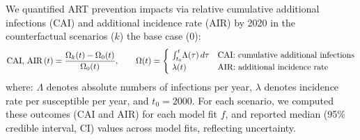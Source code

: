 \par
We quantified ART prevention impacts via relative
cumulative additional infections (CAI) and additional incidence rate (AIR) by 2020
in the counterfactual scenarios ($k$) \vs the base case ($0$):
\begin{equation}\label{eq:art.api}
  \textnormal{CAI, AIR}\,(t) = \frac{\Omega_{k}(t) - \Omega_{0}(t)}{\Omega_{0}(t)}
  ,\qquad \Omega(t) =
  \begin{cases}
    ~\int_{t_0}^{t}\!\Lambda(\tau)\,d\tau & \textnormal{CAI: cumulative additional infections} \\
    ~\lambda(t) & \textnormal{AIR: additional incidence rate}
  \end{cases}
\end{equation} where:
$\Lambda$ denotes absolute numbers of infections per year,
$\lambda$ denotes incidence rate per susceptible per year,
and $t_0 = 2000$.
For each scenario, we computed these outcomes (CAI and AIR) for each model fit $f$,
and reported median (95\% credible interval, CI) values across model fits, reflecting uncertainty.

